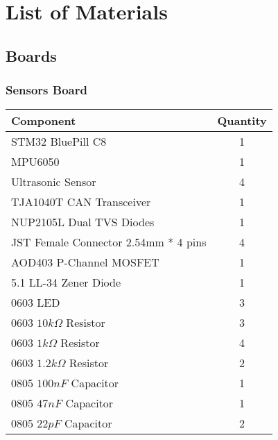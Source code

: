 \chapter{List of Materials}
\section{Boards}
\subsection{Sensors Board}
\begin{center}
	\setlength\extrarowheight{7pt}
	\begin{tabular}{lc}
		{\large Component} & {\large Quantity} \\\midrule
		{\large STM32 BluePill C8} & {\large 1} \\
		{\large MPU6050} & {\large 1} \\
		{\large Ultrasonic Sensor} & {\large 4} \\
		{\large TJA1040T CAN Transceiver} & {\large 1} \\
		{\large NUP2105L Dual TVS Diodes} & {\large 1} \\ 
		{\large JST Female Connector 2.54mm * 4 pins} & {\large 4} \\
		{\large AOD403 P-Channel MOSFET} & {\large 1}\\
		{\large 5.1 LL-34 Zener Diode} & {\large 1} \\
		{\large 0603 LED} & {\large 3} \\
		{\large 0603 $10 k\Omega$ Resistor} & {\large 3}\\
		{\large 0603 $1 k\Omega$ Resistor}  & {\large 4}\\
		{\large 0603 $1.2 k\Omega$ Resistor}  & {\large 2}\\
		{\large 0805 $100 nF$ Capacitor}  & {\large 1}\\
		{\large 0805 $47 nF$ Capacitor}  & {\large 1}\\
		{\large 0805 $22 pF$ Capacitor}  & {\large 2}\\
	\end{tabular}
\end{center}
\newpage
